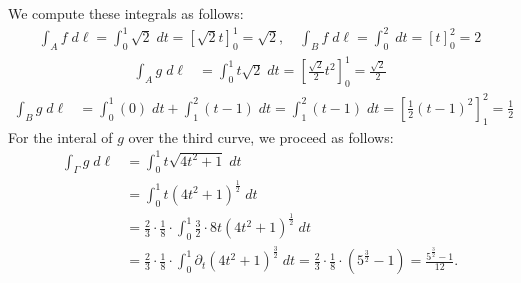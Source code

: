\documentclass[11pt]{article}
\begin{document}
\begin{solution}  
     We compute these integrals as follows:
     \begin{align*}
        \int_A f \;d\ell
        =
        \int_0^1 \sqrt{2} \;dt = \left[\sqrt{2}t\right]_0^1 = \sqrt{2}
        ,
        \quad 
        \int_B f \;d\ell
        = 
        \int_0^2 \;dt = \left[t \right]_0^2  = 2
    \end{align*}  
    \begin{align*}
        \int_A g \;d\ell
        &= \int_0^1 t \sqrt{2} \;dt = \left[\frac{\sqrt{2}}{2}t^2 \right]_0^1 = \frac{\sqrt{2}}{2}
    \end{align*}
    \begin{align*}
        \int_B g \;d\ell
        &=
        \int_0^1 (0) \;dt + \int_1^2 (t-1) \;dt  
        = 
        \int_1^2 (t-1) \;dt 
        = 
        \left[ \frac{1}{2} (t-1)^2 \right]_1^2 = \frac{1}{2}
    \end{align*}
    For the interal of $g$ over the third curve, we proceed as follows:
    \begin{align*}
        \int_\Gamma g \;d\ell
        &=
        \int_0^1 t \sqrt{ 4t^2 + 1 } \;dt
        \\&=
        \int_0^1 t \left( 4t^2 + 1 \right)^{\frac 1 2} \;dt
        \\&=
        \frac 2 3 \cdot \frac 1 8 \cdot 
        \int_0^1 \frac 3 2 \cdot 8t \left( 4t^2 + 1 \right)^{\frac 1 2} \;dt
        \\&=
        \frac 2 3 \cdot \frac 1 8 \cdot 
        \int_0^1 \partial_t \left( 4t^2 + 1 \right)^{\frac 3 2} \;dt
        =
        \frac 2 3 \cdot \frac 1 8 \cdot 
        \left( 5^{\frac 3 2} - 1 \right)
        = 
        \frac{ 5^{\frac 3 2} - 1 }{12}
        .
    \end{align*}

\end{solution}
\end{document}
